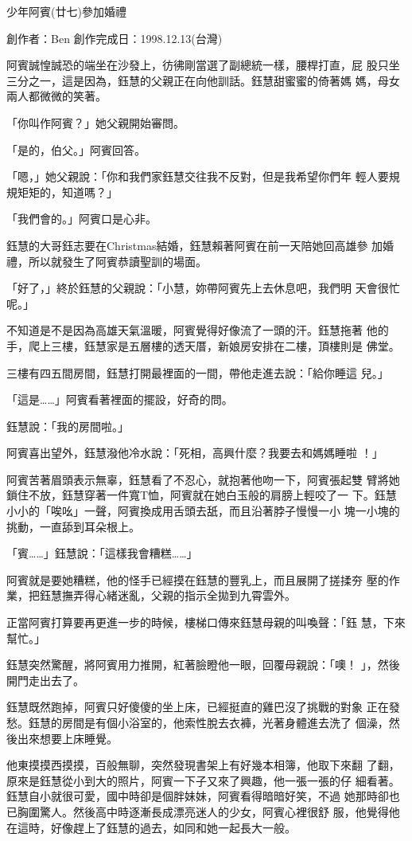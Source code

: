 



少年阿賓(廿七)參加婚禮

創作者：Ben
創作完成日：1998.12.13(台灣)


阿賓誠惶誠恐的端坐在沙發上，彷彿剛當選了副總統一樣，腰桿打直，屁
股只坐三分之一，這是因為，鈺慧的父親正在向他訓話。鈺慧甜蜜蜜的倚著媽
媽，母女兩人都微微的笑著。

「你叫作阿賓？」她父親開始審問。

「是的，伯父。」阿賓回答。

「嗯，」她父親說：「你和我們家鈺慧交往我不反對，但是我希望你們年
輕人要規規矩矩的，知道嗎？」

「我們會的。」阿賓口是心非。

鈺慧的大哥鈺志要在Christmas結婚，鈺慧賴著阿賓在前一天陪她回高雄參
加婚禮，所以就發生了阿賓恭讀聖訓的場面。

「好了，」終於鈺慧的父親說：「小慧，妳帶阿賓先上去休息吧，我們明
天會很忙呢。」

不知道是不是因為高雄天氣溫暖，阿賓覺得好像流了一頭的汗。鈺慧拖著
他的手，爬上三樓，鈺慧家是五層樓的透天厝，新娘房安排在二樓，頂樓則是
佛堂。

三樓有四五間房間，鈺慧打開最裡面的一間，帶他走進去說：「給你睡這
兒。」

「這是……」阿賓看著裡面的擺設，好奇的問。

鈺慧說：「我的房間啦。」

阿賓喜出望外，鈺慧潑他冷水說：「死相，高興什麼？我要去和媽媽睡啦
！」

阿賓苦著眉頭表示無辜，鈺慧看了不忍心，就抱著他吻一下，阿賓張起雙
臂將她鎖住不放，鈺慧穿著一件寬T恤，阿賓就在她白玉般的肩膀上輕咬了一
下。鈺慧小小的「唉吆」一聲，阿賓換成用舌頭去舐，而且沿著脖子慢慢一小
塊一小塊的挑動，一直舔到耳朵根上。

「賓……」鈺慧說：「這樣我會糟糕……」

阿賓就是要她糟糕，他的怪手已經摸在鈺慧的豐乳上，而且展開了搓揉夯
壓的作業，把鈺慧撫弄得心緒迷亂，父親的指示全拋到九霄雲外。

正當阿賓打算要再更進一步的時候，樓梯口傳來鈺慧母親的叫喚聲：「鈺
慧，下來幫忙。」

鈺慧突然驚醒，將阿賓用力推開，紅著臉瞪他一眼，回覆母親說：「噢！
」，然後開門走出去了。

鈺慧既然跑掉，阿賓只好傻傻的坐上床，已經挺直的雞巴沒了挑戰的對象
正在發愁。鈺慧的房間是有個小浴室的，他索性脫去衣褲，光著身體進去洗了
個澡，然後出來想要上床睡覺。

他東摸摸西摸摸，百般無聊，突然發現書架上有好幾本相簿，他取下來翻
了翻，原來是鈺慧從小到大的照片，阿賓一下子又來了興趣，他一張一張的仔
細看著。鈺慧自小就很可愛，國中時卻是個胖妹妹，阿賓看得暗暗好笑，不過
她那時卻也已胸圍驚人。然後高中時逐漸長成漂亮迷人的少女，阿賓心裡很舒
服，他覺得他在這時，好像趕上了鈺慧的過去，如同和她一起長大一般。

